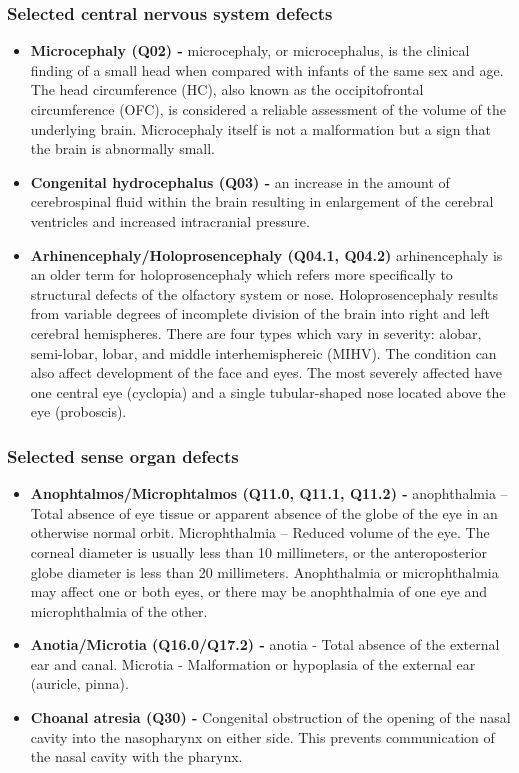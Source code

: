 \documentclass[
]{krantz}
\begin{document}
\hypertarget{section-2112}{%
\subsubsection{Selected central nervous system defects}\label{section-2112}}

\begin{itemize}
\item
  \textbf{Microcephaly (Q02) -} microcephaly, or microcephalus, is the clinical finding of a small head when compared with infants of the same sex and age. The head circumference (HC), also known as the occipitofrontal circumference (OFC), is considered a reliable assessment of the volume of the underlying brain. Microcephaly itself is not a malformation but a sign that the brain is abnormally small.
\item
  \textbf{Congenital hydrocephalus (Q03) -} an increase in the amount of cerebrospinal fluid within the brain resulting in enlargement of the cerebral ventricles and increased intracranial pressure.
\item
  \textbf{Arhinencephaly/Holoprosencephaly (Q04.1, Q04.2)} arhinencephaly is an older term for holoprosencephaly which refers more specifically to structural defects of the olfactory system or nose. Holoprosencephaly results from variable degrees of incomplete division of the brain into right and left cerebral hemispheres. There are four types which vary in severity: alobar, semi-lobar, lobar, and middle interhemisphereic (MIHV). The condition can also affect development of the face and eyes. The most severely affected have one central eye (cyclopia) and a single tubular-shaped nose located above the eye (proboscis).
\end{itemize}

\hypertarget{section-2113}{%
\subsubsection{Selected sense organ defects}\label{section-2113}}

\begin{itemize}
\item
  \textbf{Anophtalmos/Microphtalmos (Q11.0, Q11.1, Q11.2) -} anophthalmia -- Total absence of eye tissue or apparent absence of the globe of the eye in an otherwise normal orbit. Microphthalmia -- Reduced volume of the eye. The corneal diameter is usually less than 10 millimeters, or the anteroposterior globe diameter is less than 20 millimeters. Anophthalmia or microphthalmia may affect one or both eyes, or there may be anophthalmia of one eye and microphthalmia of the other.
\item
  \textbf{Anotia/Microtia (Q16.0/Q17.2) -} anotia - Total absence of the external ear and canal. Microtia - Malformation or hypoplasia of the external ear (auricle, pinna).
\item
  \textbf{Choanal atresia (Q30) -} Congenital obstruction of the opening of the nasal cavity into the nasopharynx on either side. This prevents communication of the nasal cavity with the pharynx.
\end{itemize}
\end{document}
